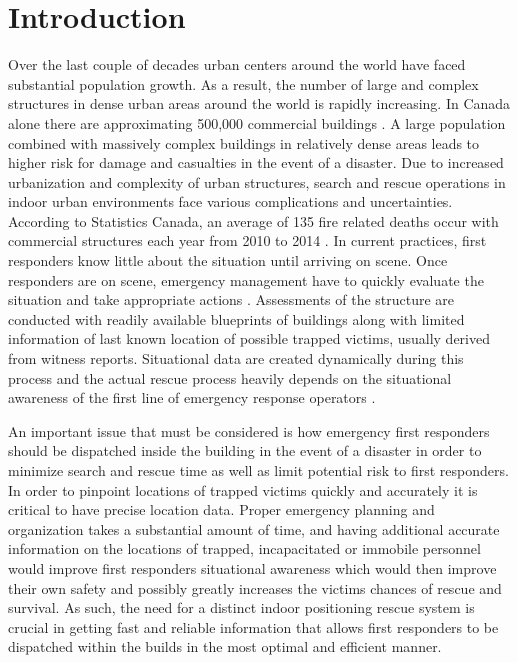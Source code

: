 

\setcounter{section}{0}
\section{Introduction}
\bigskip
Over the last couple of decades urban centers around the world have faced substantial population growth. As a result, the number of large and complex structures in dense urban areas around the world is rapidly increasing. In Canada alone there are approximating 500,000 commercial buildings \cite{R1-1}. A large population combined with massively complex buildings in relatively dense areas leads to higher risk for damage and casualties in the event of a disaster. Due to increased urbanization and complexity of urban structures, search and rescue operations in indoor urban environments face various complications and uncertainties. According to Statistics Canada, an average of 135 fire related deaths occur with commercial structures each year from 2010 to 2014 \cite{R1-2}. In current practices, first responders know little about the situation until arriving on scene. Once responders are on scene, emergency management have to quickly evaluate the situation and take appropriate actions \cite{R1-3}.  Assessments of the structure are conducted with readily available blueprints of buildings along with limited information of last known location of possible trapped victims, usually derived from witness reports. Situational data are created dynamically during this process and the actual rescue process heavily depends on the situational awareness of the first line of emergency response operators \cite{R1-4}.

\bigskip
An important issue that must be considered is how emergency first responders should be dispatched inside the building in the event of a disaster in order to minimize search and rescue time as well as limit potential risk to first responders. In order to pinpoint locations of trapped victims quickly and accurately it is critical to have precise location data. Proper emergency planning and organization takes a substantial amount of time, and having additional accurate information on the locations of trapped, incapacitated or immobile personnel would improve first responders situational awareness which would then improve their own safety and possibly greatly increases the victims chances of rescue and survival. As such, the need for a distinct indoor positioning rescue system is crucial in getting fast and reliable information that allows first responders to be dispatched within the builds in the most optimal and efficient manner. 

